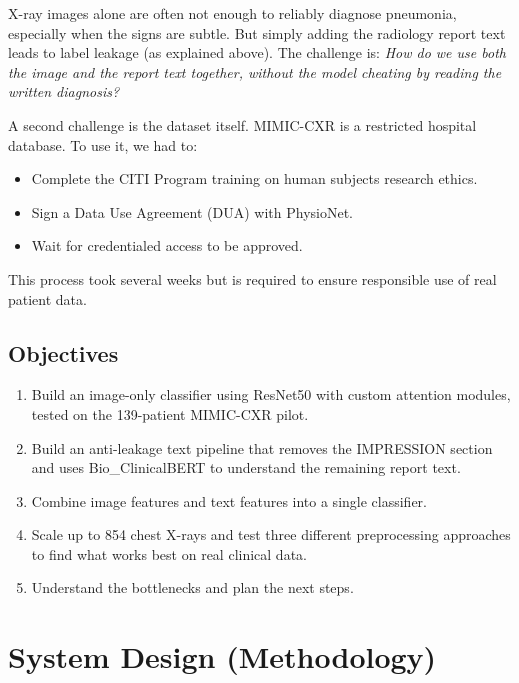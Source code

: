 \documentclass{article}
\begin{document}
X-ray images alone are often not enough to reliably diagnose pneumonia,
especially when the signs are subtle. But simply adding the radiology report
text leads to label leakage (as explained above). The challenge is:
\textit{How do we use both the image and the report text together, without
the model cheating by reading the written diagnosis?}

A second challenge is the dataset itself. MIMIC-CXR is a restricted hospital
database. To use it, we had to:
\begin{itemize}[noitemsep, leftmargin=*]
  \item Complete the CITI Program training on human subjects research ethics.
  \item Sign a Data Use Agreement (DUA) with PhysioNet.
  \item Wait for credentialed access to be approved.
\end{itemize}
This process took several weeks but is required to ensure responsible use of
real patient data.

\subsection{Objectives}

\begin{enumerate}[noitemsep, leftmargin=*]
  \item Build an image-only classifier using ResNet50 with custom attention
        modules, tested on the 139-patient MIMIC-CXR pilot.
  \item Build an anti-leakage text pipeline that removes the IMPRESSION section
        and uses Bio\_ClinicalBERT to understand the remaining report text.
  \item Combine image features and text features into a single classifier.
  \item Scale up to 854 chest X-rays and test three different preprocessing
        approaches to find what works best on real clinical data.
  \item Understand the bottlenecks and plan the next steps.
\end{enumerate}

\section{System Design (Methodology)}
\end{document}
